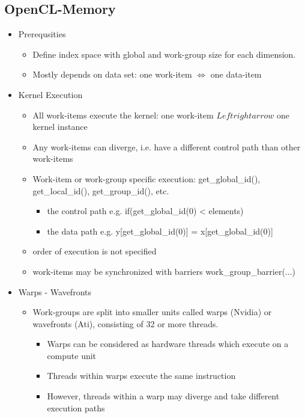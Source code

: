 \documentclass[paper=a4, fontsize=11pt]{scrartcl} %
\numberwithin{equation}{section} %
\numberwithin{figure}{section} %
\numberwithin{table}{section} %
\begin{document}
\subsection{OpenCL-Memory}

\begin{itemize}
  \item Prerequsities
  \begin{itemize}
    \item Define index space with global and work-group size for each dimension.
    \item Mostly depends on data set: one work-item $\Leftrightarrow$ one data-item
  \end{itemize}
  \item Kernel Execution
  \begin{itemize}
    \item All work-items execute the kernel: one work-item $Leftrightarrow$ one kernel instance
    \item Any work-items can diverge, i.e. have a different control path than other work-items
    \item Work-item or work-group specific execution: get_global_id(), get_local_id(), get_group_id(), etc.
    \begin{itemize}
      \item the control path e.g. if(get_global_id(0) < elements)
      \item the data path e.g. y[get_global_id(0)] = x[get_global_id(0)]
    \end{itemize}
    \item order of execution is not specified
    \item work-items may be synchronized with barriers work_group_barrier(...)
  \end{itemize}
  \item Warps - Wavefronts
  \begin{itemize}
    \item Work-groups are split into smaller units called warps (Nvidia) or wavefronts (Ati), consisting of 32 or more threads.
    \begin{itemize}
      \item Warps can be considered as hardware threads which execute on a compute unit
      \item Threads within warps execute the same instruction
      \item However, threads within a warp may diverge and take different execution paths
    \end{itemize}

\end{itemize}
\end{itemize}
\end{document}
